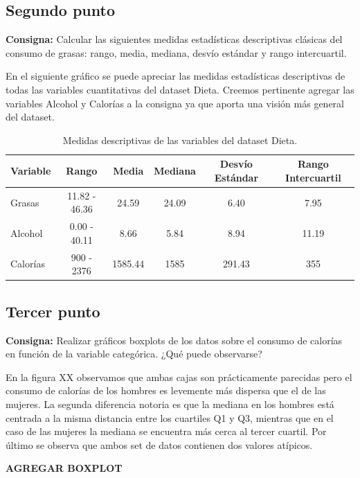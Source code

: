 \documentclass{article} %
\begin{document}
\subsection{Segundo punto}

\textbf{Consigna:} Calcular las siguientes medidas estadísticas descriptivas clásicas del consumo de grasas: rango, media, mediana, desvío estándar y rango intercuartil.

En el siguiente gráfico se puede apreciar las medidas estadísticas descriptivas de todas las variables cuantitativas del dataset Dieta. Creemos pertinente agregar las variables Alcohol y Calorías a la consigna ya que aporta una visión más general del dataset.

\begin{table}[H]
	\centering
		\begin{tabular}{||l || c | c | c | c | c ||}
			\hline
			\hline
			Variable & Rango & Media & Mediana & Desvío Estándar & Rango Intercuartil\\
			\hline			
			\hline
			Grasas & 11.82 - 46.36 & 24.59 & 24.09 & 6.40 & 7.95\\
			\hline
			Alcohol & 0.00 - 40.11 & 8.66 & 5.84 & 8.94 & 11.19\\
			\hline
			Calorías & 900 - 2376 & 1585.44 & 1585 & 291.43 & 355\\
			\hline
			\hline
		\end{tabular}
		\caption{Medidas descriptivas de las variables del dataset Dieta.}
	\label{tab:table-punto-1-2}
\end{table}

\subsection{Tercer punto}

\textbf{Consigna:} Realizar gráficos boxplots de los datos sobre el consumo de calorías en función de la variable categórica. ¿Qué puede observarse?

En la figura XX observamos que ambas cajas son prácticamente parecidas pero el consumo de calorías de los hombres es levemente más dispersa que el de las mujeres. La segunda diferencia notoria es que la mediana en los hombres está centrada a la misma distancia entre los cuartiles Q1 y Q3, mientras que en el caso de las mujeres la mediana se encuentra más cerca al tercer cuartil. Por último se observa que ambos set de datos contienen dos valores atípicos. 

\textbf{AGREGAR BOXPLOT}
\end{document}
